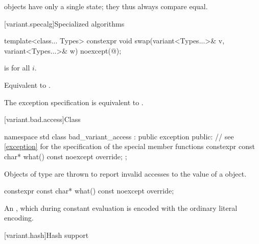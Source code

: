 \begin{itemdescr}
\pnum
\begin{note}
 objects have only a single state; they thus always compare equal.
\end{note}
\end{itemdescr}

[variant.specalg]{Specialized algorithms}

%
\begin{itemdecl}
template<class... Types>
  constexpr void swap(variant<Types...>& v, variant<Types...>& w) noexcept(@\seebelow@);
\end{itemdecl}

\begin{itemdescr}
\pnum
\constraints
{}
is  for all $i$.

\pnum
\effects
Equivalent to .

\pnum
\remarks
The exception specification is equivalent to .
\end{itemdescr}

[variant.bad.access]{Class }%
%

\begin{codeblock}
namespace std {
  class bad_variant_access : public exception {
  public:
    // see \ref{exception} for the specification of the special member functions
    constexpr const char* what() const noexcept override;
  };
}
\end{codeblock}

\pnum
Objects of type  are thrown to report invalid
accesses to the value of a  object.

%
\begin{itemdecl}
constexpr const char* what() const noexcept override;
\end{itemdecl}

\begin{itemdescr}
\pnum
\returns
An  \ntbs{},
which during constant evaluation is encoded with
the ordinary literal encoding.
\end{itemdescr}

[variant.hash]{Hash support}


